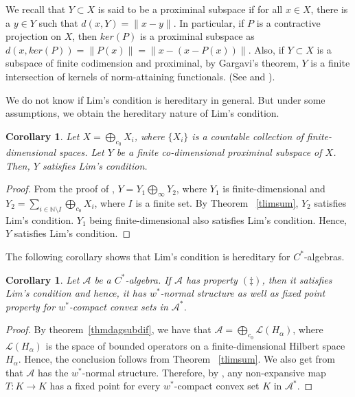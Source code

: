 \documentclass[11pt]{amsart}
\newcommand{\N}{\mathbb{N}}
\newtheorem{cor}[thm]{Corollary}
\begin{document}
We recall that $Y \subset X$ is said to be a proximinal subspace if for all $x \in X$, there is a $y \in Y$ such that  $d(x,Y)= \|x-y\|$. In particular, if $P$ is a contractive projection on $X$, then $ker(P)$ is a proximinal subspace as $d(x,ker(P))=\|P(x)\|=\|x-(x-P(x))\|$. Also, if $Y\subset X$ is a subspace of finite codimension and proximinal, by Gargavi's theorem, $Y$ is a finite intersection of kernels of norm-attaining functionals. (See \cite{Sin} and \cite[Lemma 2.1]{NR}).

We do not know if Lim's condition is hereditary in general. But under some assumptions, we obtain the hereditary nature of Lim's condition.

\begin{cor}
Let $X=\bigoplus_{c_0} X_i$, where $\{X_i\}$ is a countable collection of finite-dimensional spaces. Let $Y$ be a finite co-dimensional proximinal subspace of $X$. Then, $Y$ satisfies Lim's condition.
\end{cor}

\begin{proof}
From the proof of \cite[Proposition 3.10 ((ii) $\implies$ (i))]{NR}, $Y=Y_1 \bigoplus_{\infty}Y_2$, where $Y_1$ is finite-dimensional and $Y_2=\sum_{i \in \N \setminus I}\bigoplus_{c_0}X_i$, where $I$ is a finite set. By Theorem ~\ref{tlimsum}, $Y_2$ satisfies Lim's condition. $Y_1$ being finite-dimensional also satisfies Lim's condition. Hence, $Y$ satisfies Lim's condition.
\end{proof}

The following corollary shows that Lim's condition is hereditary for $C^*$-algebras.

\begin{cor} Let $\mathcal{A}$ be a $C^\ast$-algebra. If $\mathcal{A}$ has property $(\ddag)$, then it satisfies Lim's condition and hence, it has $w^*$-normal structure as well as fixed point property for $w^*$-compact convex sets in ${\mathcal A}^\ast$.
\end{cor}

\begin{proof} 
By theorem~\ref{thmdagsubdif}, we have that $\mathcal{A}=\bigoplus_{c_0}\mathcal{L}(H_\alpha)$, where $\mathcal{L}(H_\alpha)$ is the space of bounded operators on a finite-dimensional Hilbert space $H_\alpha$. Hence, the conclusion follows from Theorem ~\ref{tlimsum}. We also get from \cite[Lemma 4]{LM} that ${\mathcal A}$ has the $w^*$-normal structure. Therefore, by \cite[Theorem 1]{Lim}, any non-expansive map $T: K \rightarrow K$ has a fixed point for every $w^*$-compact convex set $K$ in ${\mathcal A}^\ast$.
\end{proof}	
\end{document}
